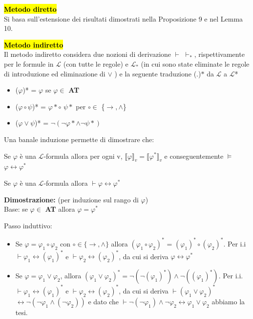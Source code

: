 \documentclass[a4paper, 12pt]{book}
\newcommand{\proposizione}[1]{%
\vspace{15pt}%
\begin{tcolorbox}[
  colback=cyan!5!white,
  colframe=blue!50!black,
  title=\textbf{Proposizione}, %
  coltitle=white,
  fonttitle=\bfseries,
  arc=3mm,
  boxrule=0.5pt,
  enhanced,
  breakable
]
#1 %
\end{tcolorbox}
\vspace{15pt}%
}
\begin{document}
\textbf{\hl{Metodo diretto}}\\
Si basa sull’estensione dei risultati dimostrati nella Proposizione 9 e nel Lemma 10.

\textbf{\hl{Metodo indiretto}}\\
Il metodo indiretto considera due nozioni di derivazione $\vdash$ $\vdash_*$, rispettivamente per le formule in $\mathcal{L}$ (con tutte le regole) e $\mathcal{L}_*$ (in cui sono state eliminate le regole di introduzione ed eliminazione di $\lor$ ) e la seguente traduzione (.)$\ast$ da $\mathcal{L}$ a $\mathcal{L}$*

\begin{itemize}
  \item ($\varphi$)* = $\varphi$ se $\varphi \in$ \textbf{AT}
  \item ($\varphi \circ \psi$)* = $\varphi* \circ$ $\psi*$ per $\circ \in$ \{$\rightarrow, \land$\}
  \item ($\varphi \lor \psi$)* = $\lnot(\lnot \varphi* \land \lnot \psi*)$ 
\end{itemize}

Una banale induzione permette di dimostrare che:

\proposizione{Se $\varphi$ è una $\mathcal{L}$-formula allora per ogni v, $\llbracket \varphi \rrbracket_v = \llbracket \varphi^* \rrbracket_v$ e conseguentemente $\models$ $\varphi \leftrightarrow \varphi^*$}

\proposizione{Se $\varphi$ è una $\mathcal{L}$-formula allora $\vdash \varphi \leftrightarrow \varphi^*$}


\textbf{Dimostrazione:} (per induzione sul rango di $\varphi$)\\
Base: se $\varphi \in$ \textbf{AT} allora $\varphi = \varphi^*$

Passo induttivo: 
\begin{itemize}
  \item Se $\varphi = \varphi_1 \circ \varphi_2$ con $\circ \in \{\rightarrow, \land\}$ allora $(\varphi_1 \circ \varphi_2)^*$ = $(\varphi_1)^* \circ (\varphi_2)^*$. Per i.i $\vdash \varphi_1 \leftrightarrow (\varphi_1)^*$ e $\vdash \varphi_2 \leftrightarrow (\varphi_2)^*$, da cui si deriva $\varphi \leftrightarrow \varphi^*$
  \item Se $\varphi = \varphi_1 \lor \varphi_2$, allora $(\varphi_1 \lor \varphi_2)^* = \lnot(\lnot(\varphi_1)^*)\land \lnot ((\varphi_1)^*)$. Per i.i. $\vdash \varphi_1 \leftrightarrow (\varphi_1)^*$ e $\vdash \varphi_2 \leftrightarrow (\varphi_2)^*$, da cui si deriva $\vdash (\varphi_1 \lor \varphi_2)^*$ $\leftrightarrow \lnot(\lnot\varphi_1 \land (\lnot \varphi_2))$ e dato che $\vdash \lnot(\lnot\varphi_1) \land \lnot \varphi_2 \leftrightarrow \varphi_1 \lor \varphi_2$ abbiamo la tesi.
\end{itemize}
\end{document}
